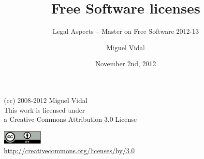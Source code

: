 \documentclass{beamer}
\begin{document}
\title{Free Software licenses}
\subtitle{Legal Aspects -- Master on Free Software 2012-13}
\author{Miguel Vidal} 
\date{November 2nd, 2012}



\begin{frame}
  \vspace{2cm}
  \begin{flushright}
    {\small (cc) 2008-2012 Miguel Vidal} \\
    \medskip
    {\scriptsize This work is licensed under \\ a Creative Commons Attribution 3.0 License}
  \end{flushright}
  \begin{flushright}
    \href{http://creativecommons.org/licenses/by/3.0}{\includegraphics[width=2cm]{format/cc-by.png}} \\
    {\tiny \url{http://creativecommons.org/licenses/by/3.0}}
  \end{flushright}
\end{frame}%

\usebackgroundtemplate{}

\end{document}
